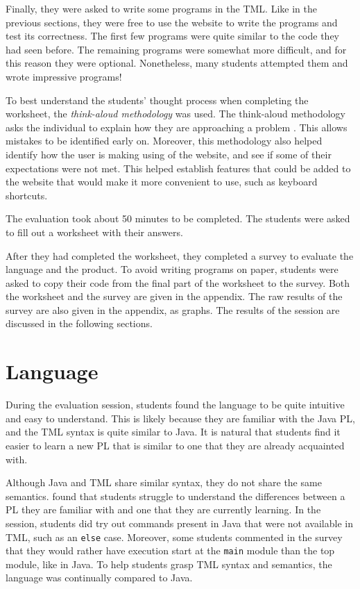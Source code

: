 Finally, they were asked to write some programs in the TML. Like in the previous sections, they were free to use the website to write the programs and test its correctness. The first few programs were quite similar to the code they had seen before. The remaining programs were somewhat more difficult, and for this reason they were optional. Nonetheless, many students attempted them and wrote impressive programs!

To best understand the students' thought process when completing the worksheet, the \emph{think-aloud methodology} was used. The think-aloud methodology asks the individual to explain how they are approaching a problem \citep{jorgensen1990thinking}. This allows mistakes to be identified early on. Moreover, this methodology also helped identify how the user is making using of the website, and see if some of their expectations were not met. This helped establish features that could be added to the website that would make it more convenient to use, such as keyboard shortcuts.

The evaluation took about 50 minutes to be completed. The students were asked to fill out a worksheet with their answers. 

After they had completed the worksheet, they completed a survey to evaluate the language and the product. To avoid writing programs on paper, students were asked to copy their code from the final part of the worksheet to the survey. Both the worksheet and the survey are given in the appendix. The raw results of the survey are also given in the appendix, as graphs. The results of the session are discussed in the following sections.

\section{Language} 
During the evaluation session, students found the language to be quite intuitive and easy to understand. This is likely because they are familiar with the Java PL, and the TML syntax is quite similar to Java. It is natural that students find it easier to learn a new PL that is similar to one that they are already acquainted with. 

Although Java and TML share similar syntax, they do not share the same semantics. \citet{tshukudu2021teachers} found that students struggle to understand the differences between a PL they are familiar with and one that they are currently learning. In the session, students did try out commands present in Java that were not available in TML, such as an \texttt{else} case. Moreover, some students commented in the survey that they would rather have execution start at the \texttt{main} module than the top module, like in Java. To help students grasp TML syntax and semantics, the language was continually compared to Java.

